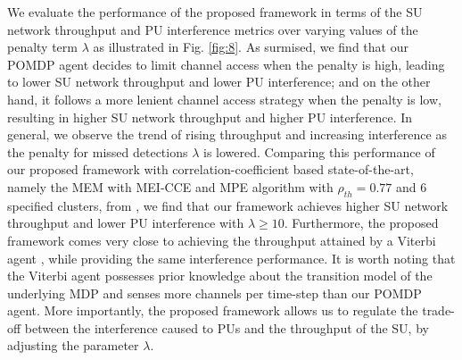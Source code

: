 \documentclass[10pt,twocolumn]{IEEEtran}
\begin{document}
We evaluate the performance of the proposed framework in terms of the SU network throughput and PU interference metrics over varying values of the penalty term $\lambda$ as illustrated in Fig. \ref{fig:8}. As surmised, we find that our POMDP agent decides to limit channel access when the penalty is high, leading to lower SU network throughput and lower PU interference; and on the other hand, it follows a more lenient channel access strategy when the penalty is low, resulting in higher SU network throughput and higher PU interference. In general, we observe the trend of rising throughput and increasing interference as the penalty for missed detections $\lambda$ is lowered. Comparing this performance of our proposed framework with correlation-coefficient based state-of-the-art, namely the MEM with MEI-CCE and MPE algorithm with $\rho_{th}{=}0.77$ and $6$ specified clusters, from \cite{6956794}, we find that our framework achieves higher SU network throughput and lower PU interference with $\lambda{\geq}10$. Furthermore, the proposed framework comes very close to achieving the throughput attained by a Viterbi agent \cite{4554696}, while providing the same interference performance. It is worth noting that the Viterbi agent possesses prior knowledge about the transition model of the underlying MDP and senses more channels per time-step than our POMDP agent. More importantly, the proposed framework allows us to regulate the trade-off between the interference caused to PUs and the throughput of the SU, by adjusting the parameter $\lambda$.
\vspace{-3.5mm}
\end{document}
